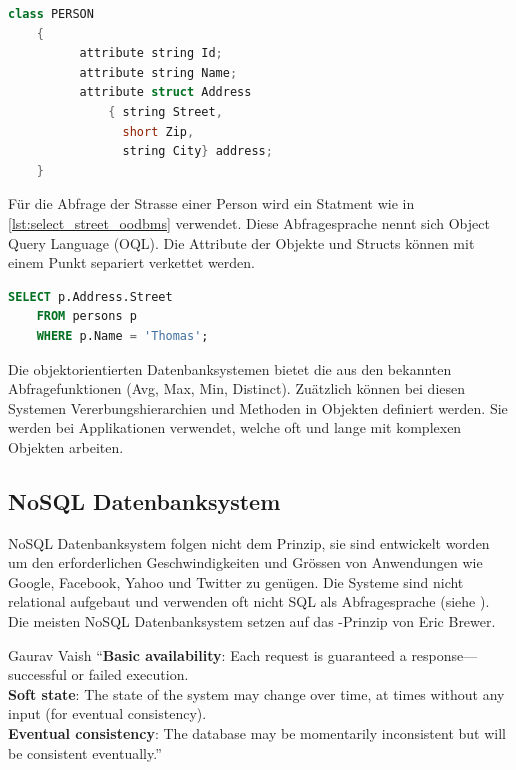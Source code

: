 \begin{lstlisting}[language=C++, caption=Objektdefinition in objektorientierem Datenbanksystem, label=lst:table_definition_oodbms]  
    class PERSON
    {
          attribute string Id;
          attribute string Name;
          attribute struct Address
              { string Street,
                short Zip,
                string City} address;
    }
\end{lstlisting}

Für die Abfrage der Strasse einer Person wird ein Statment wie in \autoref{lst:select_street_oodbms} verwendet. Diese Abfragesprache nennt
sich Object Query Language (OQL). Die Attribute der Objekte und Structs können mit einem Punkt separiert verkettet werden.

\begin{lstlisting}[language=SQL, caption=Abfrage in objektorientierem Datenbanksystem, label=lst:select_street_oodbms]  
    SELECT p.Address.Street
    FROM persons p
    WHERE p.Name = 'Thomas';
\end{lstlisting}

Die objektorientierten Datenbanksystemen bietet die aus den  bekannten Abfragefunktionen (Avg, Max, Min, Distinct). 
Zuätzlich können bei diesen Systemen Vererbungshierarchien und Methoden in Objekten definiert werden. Sie werden bei Applikationen verwendet,
welche oft und lange mit komplexen Objekten arbeiten.

\subsection{NoSQL Datenbanksystem}\label{no_sql_db}
NoSQL Datenbanksystem folgen nicht dem  Prinzip, sie sind entwickelt worden um den erforderlichen Geschwindigkeiten und Grössen von Anwendungen wie Google, 
Facebook, Yahoo und Twitter zu genügen. Die Systeme sind nicht relational aufgebaut und verwenden oft nicht SQL als Abfragesprache (siehe \cite{vaish2013getting}). 
Die meisten NoSQL Datenbanksystem setzen auf das -Prinzip von Eric Brewer.

\begin{myQuote}{Gaurav Vaish \cite{vaish2013getting}}
"`\textbf{Basic availability}: Each request is guaranteed a response—successful or failed execution.\\
\textbf{Soft state}: The state of the system may change over time, at times without any input (for eventual consistency).\\
\textbf{Eventual consistency}: The database may be momentarily inconsistent but will be consistent eventually."'
\end{myQuote}

